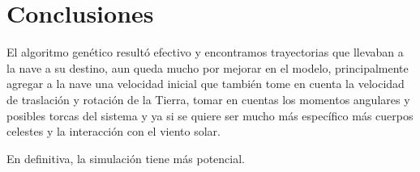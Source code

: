 \documentclass[12pt,letterpaper]{article}
\begin{document}
\section*{Conclusiones}

El algoritmo genético resultó efectivo y encontramos trayectorias que llevaban a la nave a su destino, aun queda mucho por mejorar en el modelo, principalmente agregar a la nave una velocidad inicial que también tome en cuenta la velocidad de traslación y rotación de la Tierra, tomar en cuentas los momentos angulares y posibles torcas del sistema y ya si se quiere ser mucho más específico más cuerpos celestes y la interacción con el viento solar.

En definitiva, la simulación tiene más potencial.




\end{document}
